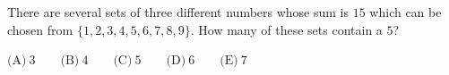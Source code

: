 There are several sets of three different numbers whose sum is $15$ which can be chosen from $\{ 1,2,3,4,5,6,7,8,9 \} $.  How many of these sets contain a $5$?



$\text{(A)}\ 3 \qquad \text{(B)}\ 4 \qquad \text{(C)}\ 5 \qquad \text{(D)}\ 6 \qquad \text{(E)}\ 7$
